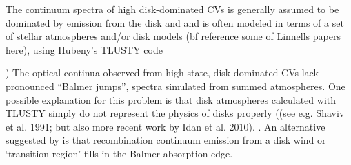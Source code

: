 \documentclass[preprint, a4paper, 11pt]{aastex}
\begin{document}
The continuum spectra of high disk-dominated CVs is generally assumed to be
dominated by emission from the disk and and is often modeled in terms of a set of stellar atmospheres
and/or disk models ({bf reference some of Linnells papers here}), using Hubeny's TLUSTY code {\cite{})
The optical continua observed from  high-state, disk-dominated CVs lack pronounced ``Balmer jumps'', 
spectra simulated from summed atmospheres.  One possible explanation for this problem is that disk atmospheres calculated
with TLUSTY simply do not represent the physics of disks properly 
((see e.g. Shaviv et al. 1991; but also more recent work by Idan et al. 2010).
\nocite{idanshaviv2010} \nocite{shaviv1991}.   
An alternative suggested by \cite{KLWB98} is that recombination continuum emission 
from a disk wind or `transition region' fills  in the Balmer absorption edge. 

     






}
\end{document}
